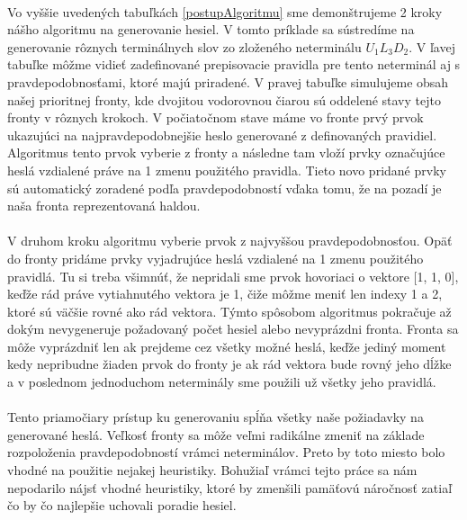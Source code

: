 \paragraph{}
Vo vyššie uvedených tabuľkách \ref{postupAlgoritmu} sme demonštrujeme 2 kroky nášho algoritmu na generovanie hesiel. V tomto príklade sa sústredíme na generovanie rôznych terminálnych slov zo zloženého neterminálu \(U_1L_3D_2\). V ľavej tabuľke môžme vidieť zadefinované prepisovacie pravidla pre tento neterminál aj s pravdepodobnosťami, ktoré majú priradené. V pravej tabuľke simulujeme obsah našej prioritnej fronty, kde dvojitou vodorovnou čiarou sú oddelené stavy tejto fronty v rôznych krokoch. V počiatočnom stave máme vo fronte prvý prvok ukazujúci na najpravdepodobnejšie heslo generované z definovaných pravidiel. Algoritmus tento prvok vyberie z fronty a následne tam vloží prvky označujúce heslá vzdialené práve na 1 zmenu použitého pravidla. Tieto novo pridané prvky sú automatický zoradené podľa pravdepodobností vďaka tomu, že na pozadí je naša fronta reprezentovaná haldou. 

\paragraph{}
V druhom kroku algoritmu vyberie prvok z najvyššou pravdepodobnosťou. Opäť do fronty pridáme prvky vyjadrujúce heslá vzdialené na 1 zmenu použitého pravidlá. Tu si treba všimnúť, že nepridali sme prvok hovoriaci o vektore [1, 1, 0], keďže rád práve vytiahnutého vektora je 1, čiže môžme meniť len indexy 1 a 2, ktoré sú väčšie rovné ako rád vektora. Týmto spôsobom algoritmus pokračuje až dokým nevygeneruje požadovaný počet hesiel alebo nevyprázdni fronta. Fronta sa môže vyprázdniť len ak prejdeme cez všetky možné heslá, keďže jediný moment kedy nepribudne žiaden prvok do fronty je ak rád vektora bude rovný jeho dĺžke a v poslednom jednoduchom neterminály sme použili už všetky jeho pravidlá.

\paragraph{}
Tento priamočiary prístup ku generovaniu spĺňa všetky naše požiadavky na generované heslá. Veľkosť fronty sa môže veľmi radikálne zmeniť na základe rozpoloženia pravdepodobností vrámci neterminálov. Preto by toto miesto bolo vhodné na použitie nejakej heuristiky. Bohužiaľ vrámci tejto práce sa nám nepodarilo nájsť vhodné heuristiky, ktoré by zmenšili pamäťovú náročnosť zatiaľ čo by čo najlepšie uchovali poradie hesiel.
